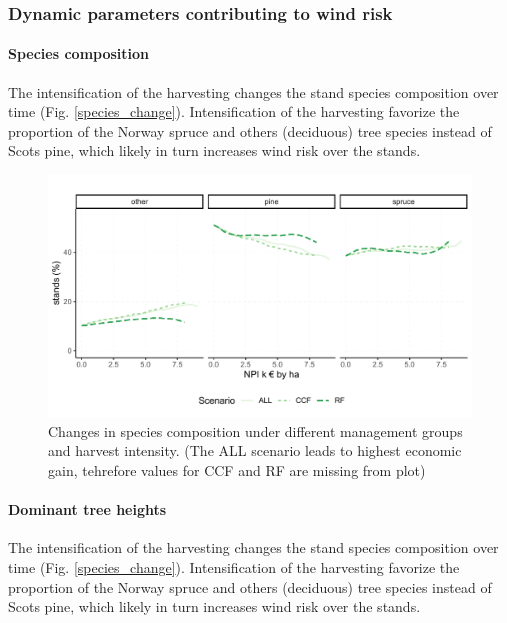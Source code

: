 \documentclass[]{elsarticle} %
\makeatletter
\def\maxwidth{\ifdim\Gin@nat@width>\linewidth\linewidth
\else\Gin@nat@width\fi}
\let\Oldincludegraphics\includegraphics
\renewcommand{\includegraphics}[1]{\Oldincludegraphics[width=\maxwidth]{#1}}
\makeatother
\begin{document}
\subsubsection{Dynamic parameters contributing to wind
risk}\label{dynamic-parameters-contributing-to-wind-risk}

\paragraph{Species composition}\label{species-composition}

The intensification of the harvesting changes the stand species
composition over time (Fig. \ref{species_change}). Intensification of
the harvesting favorize the proportion of the Norway spruce and others
(deciduous) tree species instead of Scots pine, which likely in turn
increases wind risk over the stands.

\begin{figure}
\centering
\includegraphics{test_manus_files/figure-latex/species_change-1.pdf}
\caption{Changes in species composition under different management
groups and harvest intensity. (The ALL scenario leads to highest
economic gain, tehrefore values for CCF and RF are missing from plot)}
\end{figure}

\paragraph{Dominant tree heights}\label{dominant-tree-heights}

The intensification of the harvesting changes the stand species
composition over time (Fig. \ref{species_change}). Intensification of
the harvesting favorize the proportion of the Norway spruce and others
(deciduous) tree species instead of Scots pine, which likely in turn
increases wind risk over the stands.
\end{document}
